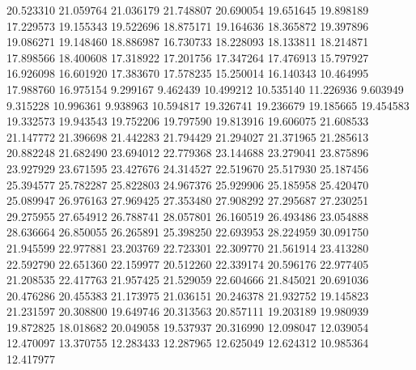 20.523310
21.059764
21.036179
21.748807
20.690054
19.651645
19.898189
17.229573
19.155343
19.522696
18.875171
19.164636
18.365872
19.397896
19.086271
19.148460
18.886987
16.730733
18.228093
18.133811
18.214871
17.898566
18.400608
17.318922
17.201756
17.347264
17.476913
15.797927
16.926098
16.601920
17.383670
17.578235
15.250014
16.140343
10.464995
17.988760
16.975154
9.299167
9.462439
10.499212
10.535140
11.226936
9.603949
9.315228
10.996361
9.938963
10.594817
19.326741
19.236679
19.185665
19.454583
19.332573
19.943543
19.752206
19.797590
19.813916
19.606075
21.608533
21.147772
21.396698
21.442283
21.794429
21.294027
21.371965
21.285613
20.882248
21.682490
23.694012
22.779368
23.144688
23.279041
23.875896
23.927929
23.671595
23.427676
24.314527
22.519670
25.517930
25.187456
25.394577
25.782287
25.822803
24.967376
25.929906
25.185958
25.420470
25.089947
26.976163
27.969425
27.353480
27.908292
27.295687
27.230251
29.275955
27.654912
26.788741
28.057801
26.160519
26.493486
23.054888
28.636664
26.850055
26.265891
25.398250
22.693953
28.224959
30.091750
21.945599
22.977881
23.203769
22.723301
22.309770
21.561914
23.413280
22.592790
22.651360
22.159977
20.512260
22.339174
20.596176
22.977405
21.208535
22.417763
21.957425
21.529059
22.604666
21.845021
20.691036
20.476286
20.455383
21.173975
21.036151
20.246378
21.932752
19.145823
21.231597
20.308800
19.649746
20.313563
20.857111
19.203189
19.980939
19.872825
18.018682
20.049058
19.537937
20.316990
12.098047
12.039054
12.470097
13.370755
12.283433
12.287965
12.625049
12.624312
10.985364
12.417977
